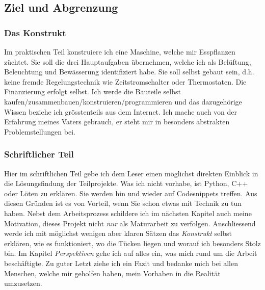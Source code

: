 \documentclass[12pt,titlepage,a4paper]{article}
\begin{document}
\subsection{Ziel und Abgrenzung}
\subsubsection{Das Konstrukt}
Im praktischen Teil konstruiere ich eine Maschine, welche mir Esspflanzen züchtet. Sie soll die drei Hauptaufgaben übernehmen, welche ich als Belüftung, Beleuchtung und Bewässerung identifiziert habe. Sie soll selbst gebaut sein, d.h. keine fremde Regelungstechnik wie Zeitstromschalter oder Thermostaten. Die Finanzierung erfolgt selbst. Ich werde die Bauteile selbst kaufen/zusammenbauen/konstruieren/programmieren und das dazugehörige Wissen beziehe ich grösstenteils aus dem Internet. Ich mache auch von der Erfahrung meines Vaters gebrauch, er steht mir in besonders abstrakten Problemstellungen bei.
\subsubsection{Schriftlicher Teil}
Hier im schriftlichen Teil gebe ich dem Leser einen möglichst direkten Einblick in die Lösungsfindung der Teilprojekte. Was ich nicht vorhabe, ist Python, C++ oder Löten zu erklären. Sie werden hin und wieder auf Codesnippets treffen. Aus diesen Gründen ist es von Vorteil, wenn Sie schon etwas mit Technik zu tun haben. Nebst dem Arbeitsprozess schildere ich im nächsten Kapitel auch meine Motivation, dieses Projekt nicht \textit{nur} als Maturarbeit zu verfolgen. Anschliessend werde ich mit möglichst wenigen aber klaren Sätzen das \textit{Konstrukt} selbst erklären, wie es funktioniert, wo die Tücken liegen und worauf ich besonders Stolz bin. Im Kapitel \textit{Perspektiven} gehe ich auf alles ein, was mich rund um die Arbeit beschäftigte. Zu guter Letzt ziehe ich ein Fazit und bedanke mich bei allen Menschen, welche mir geholfen haben, mein Vorhaben in die Realität umzusetzen.

\newpage
\end{document}
